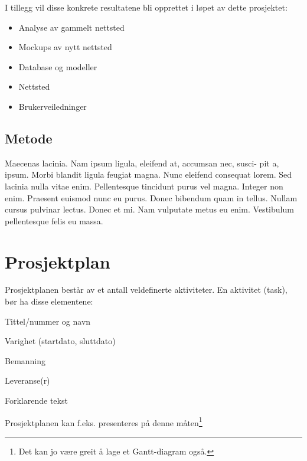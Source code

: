 \documentclass[11pt,a4paper]{report}
\begin{document}
I tillegg vil disse konkrete resultatene bli opprettet i løpet av dette prosjektet:

\begin{itemize}
\item Analyse av gammelt nettsted
\item Mockups av nytt nettsted
\item Database og modeller
\item Nettsted
\item Brukerveiledninger
\end{itemize}



\subsection*{Metode}
Maecenas lacinia. Nam ipsum ligula, eleifend at, accumsan nec, susci- pit a, ipsum. Morbi blandit ligula feugiat magna. Nunc eleifend consequat lorem. Sed lacinia nulla vitae enim. Pellentesque tincidunt purus vel magna. Integer non enim. Praesent euismod nunc eu purus. Donec bibendum quam in tellus. Nullam cursus pulvinar lectus. Donec et mi. Nam vulputate metus eu enim. Vestibulum pellentesque felis eu massa.


\section*{Prosjektplan}

Prosjektplanen består av et antall veldefinerte aktiviteter. En aktivitet (task), bør ha disse elementene: 

\begin{compactitem}
\item Tittel/nummer og navn
\item Varighet (startdato, sluttdato)
\item Bemanning 
\item Leveranse(r)
\item Forklarende tekst
\end{compactitem}

Prosjektplanen kan f.eks. presenteres på denne måten\footnote{Det kan jo være greit å lage et Gantt-diagram også.}
\end{document}
